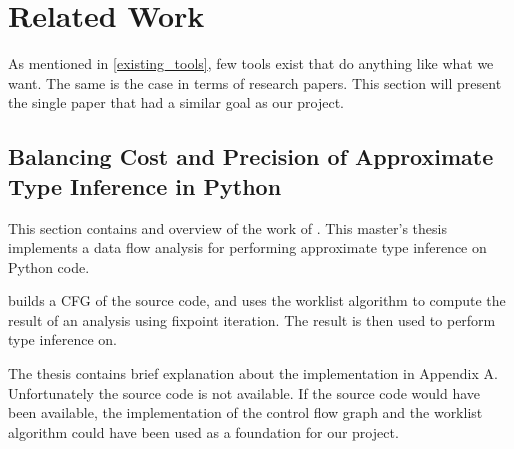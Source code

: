 \section{Related Work}
As mentioned in \cref{existing_tools}, few tools exist that do anything like what we want.
The same is the case in terms of research papers.
This section will present the single paper that had a similar goal as our project.

\subsection{Balancing Cost and Precision of Approximate Type Inference in Python}
This section contains and overview of the work of \citet{fritz}.
This master's thesis implements a data flow analysis for performing approximate type inference on Python code.

\citet{fritz} builds a CFG of the source code, and uses the worklist algorithm to compute the result of an analysis using fixpoint iteration.
The result is then used to perform type inference on.

The thesis contains brief explanation about the implementation in Appendix A.
Unfortunately the source code is not available.
If the source code would have been available, the implementation of the control flow graph and the worklist algorithm could have been used as a foundation for our project.
